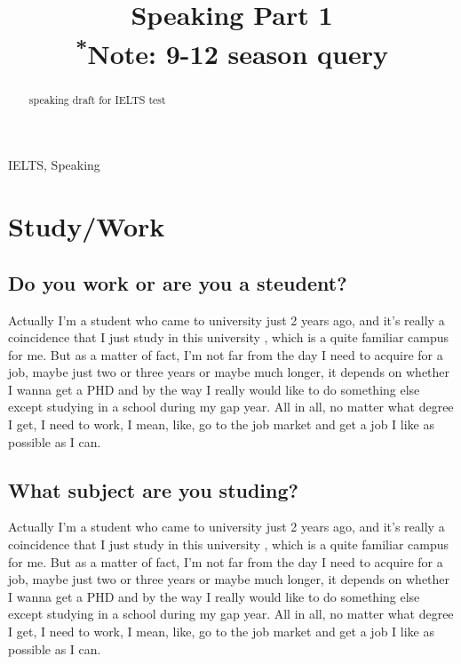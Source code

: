 \documentclass[conference]{IEEEtran}
\begin{document}
\title{Speaking Part 1\\
{\footnotesize \textsuperscript{*}Note:
9-12 season query}
}

\author{
}

\maketitle

\begin{abstract}
speaking draft for IELTS test
\end{abstract}

\begin{IEEEkeywords}
IELTS, Speaking
\end{IEEEkeywords}


\section{Study/Work}

\subsection{Do you work or are you a steudent?}
Actually I’m a student who came to university just 2 years ago, 
and it’s really a coincidence that I just study in this university
, which is a quite familiar campus for me.
But as a matter of fact, I’m not far from the day I need to acquire for a job, 
maybe just two or three years or maybe much longer, 
it depends on whether I wanna get a PHD and by the way I really 
would like to do something else except studying in a school during my gap year. 
All in all, no matter what degree I get, I need to work, 
I mean, like, go to the job market and get a job I like as possible as I can.

\subsection{What subject are you studing?}
Actually I’m a student who came to university just 2 years ago, 
and it’s really a coincidence that I just study in this university
, which is a quite familiar campus for me.
But as a matter of fact, I’m not far from the day I need to acquire for a job, 
maybe just two or three years or maybe much longer, 
it depends on whether I wanna get a PHD and by the way I really 
would like to do something else except studying in a school during my gap year. 
All in all, no matter what degree I get, I need to work, 
I mean, like, go to the job market and get a job I like as possible as I can.
\end{document}

